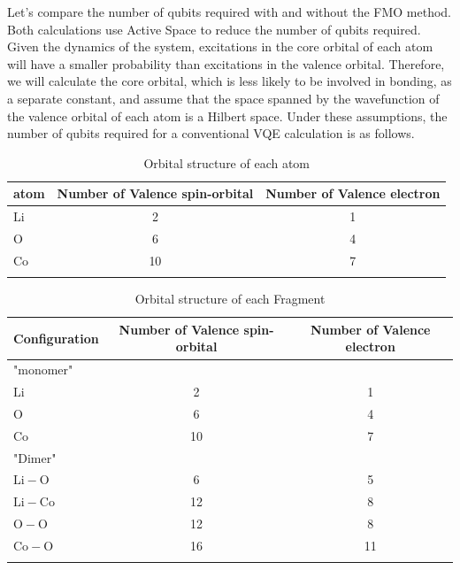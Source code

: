 \documentclass[pdflatex,sn-mathphys-num]{sn-jnl}%
\theoremstyle{thmstyleone}%
\theoremstyle{thmstyletwo}%
\theoremstyle{thmstylethree}%
\begin{document}
Let's compare the number of qubits required with and without the FMO method. Both calculations use Active Space to reduce the number of qubits required. Given the dynamics of the system, excitations in the core orbital of each atom will have a smaller probability than excitations in the valence orbital. Therefore, we will calculate the core orbital, which is less likely to be involved in bonding, as a separate constant, and assume that the space spanned by the wavefunction of the valence orbital of each atom is a Hilbert space. Under these assumptions, the number of qubits required for a conventional VQE calculation is as follows. 
\begin{table}[h]
\caption{Orbital structure of each atom}\label{tab1}%
\begin{tabular}{@{}lcc@{}}
\toprule
atom & Number of Valence spin-orbital  & Number of Valence electron\\
\midrule
\(\mathrm{Li}\)   & 2   & 1   \\
\(\mathrm{O}\)   & 6   & 4  \\
\(\mathrm{Co}\)   & 10   & 7   \\
\botrule
\end{tabular}
\end{table}
\begin{table}[h]
\caption{Orbital structure of each Fragment}\label{tab2}%
\begin{tabular}{@{}lcc@{}}
\toprule
Configuration & Number of Valence spin-orbital  & Number of Valence electron\\
\midrule
"monomer"   &   &  \\
\(\mathrm{Li}\)   & 2   & 1   \\
\(\mathrm{O}\)   & 6   & 4  \\
\(\mathrm{Co}\)   & 10   & 7   \\
"Dimer"   &   &  \\
\(\mathrm{Li-O}\)   & 6   & 5   \\
\(\mathrm{Li-Co}\)   & 12   & 8  \\
\(\mathrm{O-O}\)   & 12   & 8   \\
\(\mathrm{Co-O}\)   & 16   & 11   \\
\botrule
\end{tabular}
\end{table}
\end{document}
